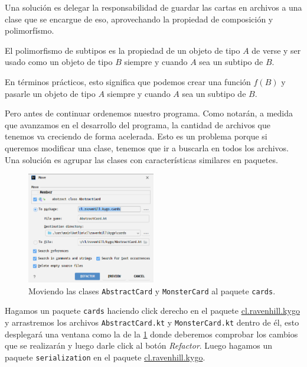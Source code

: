   Una solución es delegar la responsabilidad de guardar las cartas en archivos a una clase que se 
  encargue de eso, aprovechando la propiedad de composición y polimorfísmo.

  \begin{defaultbox}
    El polimorfismo de subtipos es la propiedad de un objeto de tipo \(A\) de verse y ser usado como
    un objeto de tipo \(B\) siempre y cuando \(A\) sea un subtipo de \(B\).
  \end{defaultbox}

  En términos prácticos, esto significa que podemos crear una función \(f(B)\) y pasarle un objeto
  de tipo \(A\) siempre y cuando \(A\) sea un subtipo de \(B\).

  Pero antes de continuar ordenemos nuestro programa.
  Como notarán, a medida que avanzamos en el desarrollo del programa, la cantidad de archivos que
  tenemos va creciendo de forma acelerada.
  Esto es un problema porque si queremos modificar una clase, tenemos que ir a buscarla en todos
  los archivos.
  Una solución es agrupar las clases con características similares en paquetes.

  \begin{figure}[ht!]
    \centering
    \includegraphics[width=0.5\textwidth]{img/oop/principios/clases_abstractas/idea64_move.png}
    \caption{Moviendo las clases \texttt{AbstractCard} y \texttt{MonsterCard} al paquete \texttt{cards}.}
    \label{fig:oop:principios:clases_abstractas:move}
  \end{figure}

  Hagamos un paquete \texttt{cards} haciendo click derecho en el paquete 
  \url{cl.ravenhill.kygo} y arrastremos los archivos \texttt{AbstractCard.kt} y
  \texttt{MonsterCard.kt} dentro de él, esto desplegará una ventana como la de la 
  \cref{fig:oop:principios:clases_abstractas:move} donde deberemos comprobar los cambios que se
  realizarán y luego darle click al botón \textit{Refactor}.
  Luego hagamos un paquete \texttt{serialization} en el paquete \url{cl.ravenhill.kygo}.

